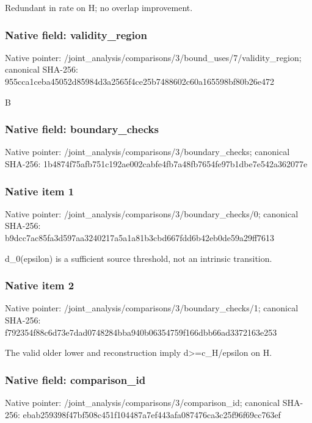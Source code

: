 \documentclass[10pt,a4paper]{article}
\begin{document}
\begingroup\raggedright\sloppy Redundant in rate on H;\allowbreak{} no overlap improvement.\par\endgroup

\subsubsection{Native field: validity\_\allowbreak{}region}
Native pointer: /joint\_\allowbreak{}analysis/comparisons/3/bound\_\allowbreak{}uses/7/validity\_\allowbreak{}region; canonical SHA-256: 955cca1ceba45052d85984d3a2565f4ce25b7488602c60a165598bf80b26e472

\begingroup\raggedright\sloppy B\par\endgroup

\subsubsection{Native field: boundary\_\allowbreak{}checks}
Native pointer: /joint\_\allowbreak{}analysis/comparisons/3/boundary\_\allowbreak{}checks; canonical SHA-256: 1b4874f75afb751c192ae002cabfe4fb7a48fb7654fe97b1dbe7e542a362077e

\subsubsection{Native item 1}
Native pointer: /joint\_\allowbreak{}analysis/comparisons/3/boundary\_\allowbreak{}checks/0; canonical SHA-256: b9dcc7ac85fa3d597aa3240217a5a1a81b3cbd667fdd6b42eb0de59a29ff7613

\begingroup\raggedright\sloppy d\_\allowbreak{}0(epsilon) is a sufficient source threshold,\allowbreak{} not an intrinsic transition.\par\endgroup

\subsubsection{Native item 2}
Native pointer: /joint\_\allowbreak{}analysis/comparisons/3/boundary\_\allowbreak{}checks/1; canonical SHA-256: f792354f88c6d73e7dad0748284bba940b06354759f166dbb66ad3372163e253

\begingroup\raggedright\sloppy The valid older lower and reconstruction imply d>=\allowbreak{}c\_\allowbreak{}H/\allowbreak{}epsilon on H.\par\endgroup

\subsubsection{Native field: comparison\_\allowbreak{}id}
Native pointer: /joint\_\allowbreak{}analysis/comparisons/3/comparison\_\allowbreak{}id; canonical SHA-256: ebab259398f47bf508c451f104487a7ef443afa087476ca3c25f96f69cc763ef
\end{document}
